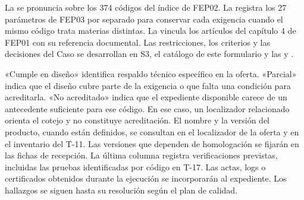\providecommand\localizadorRT[3]{%
  #1\ifcsname r@#2\endcsname\space(\verSeccionFolio{#2})\else
    \ifcsname r@S#3-#2\endcsname\space(\verSeccionFolio{#2}\SiFolioContinuo{}{,~p.~\folio{#2} del PDF})\fi
  \fi}


La  se pronuncia sobre los 374 códigos del índice de FEP02. La
 registra los 27 parámetros de FEP03 por separado para conservar cada exigencia
cuando el mismo código trata materias distintas. La  vincula los artículos
del capítulo 4 de FEP01 con su referencia documental. Las restricciones, los criterios y las
decisiones del Caso se desarrollan en S3, el catálogo de este formulario y las
 y .

«Cumple en diseño» identifica respaldo técnico específico en la oferta. «Parcial» indica que el
diseño cubre parte de la exigencia o que falta una condición para acreditarla. «No acreditado»
indica que el expediente disponible carece de un antecedente suficiente para ese código. En
ese caso, un localizador relacionado orienta el cotejo y no constituye acreditación. El nombre
y la versión del producto, cuando están definidos, se consultan en el localizador de la oferta y
en el inventario del T-11. Las versiones que dependen de homologación se fijarán en las fichas
de recepción. La última columna registra verificaciones previstas, incluidas las pruebas
identificadas por código en T-17. Las actas, logs o certificados obtenidos durante la ejecución
se incorporarán al expediente. Los hallazgos se siguen hasta su resolución según el plan de
calidad.

